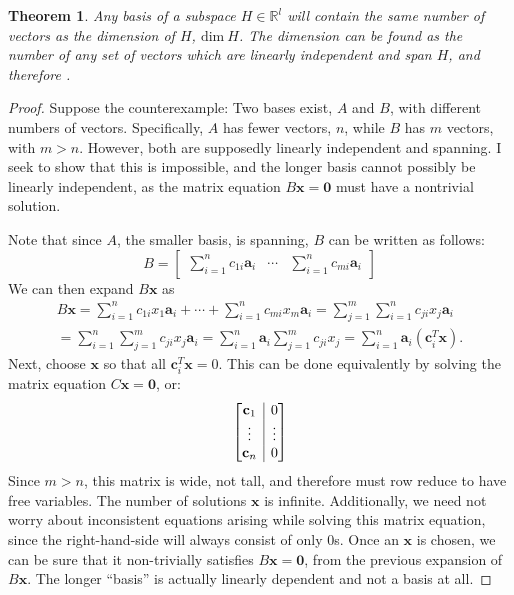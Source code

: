 \documentclass[draft,12pt]{report}
\makeatletter
\newtheorem{theorem}{Theorem}
\newenvironment{amatrix}[1]{%
  \left[\begin{array}{@{}*{#1}{c}|c@{}}
}{%
  \end{array}\right]
}
\renewcommand{\vec}[1]{\mathbf{#1}}
\makeatother
\begin{document}
\begin{theorem}
    Any basis of a subspace $H \in \mathbb R^l$ will contain the same number of vectors as the dimension of $H$, $\mathrm{dim\ } H$. The dimension can be found as the number of any set of vectors which are linearly independent and span $H$, and therefore .
\end{theorem}
\begin{proof}
    Suppose the counterexample: Two bases exist, $A$ and $B$, with different numbers of vectors. Specifically, $A$ has fewer vectors, $n$, while $B$ has $m$ vectors, with $m > n$. However, both are supposedly linearly independent and spanning. I seek to show that this is impossible, and the longer basis cannot possibly be linearly independent, as the matrix equation $B\vec{x} = \vec{0}$ must have a nontrivial solution.
    
    Note that since $A$, the smaller basis, is spanning, $B$ can be written as follows:
    \[ B = \begin{bmatrix} \sum_{i = 1}^n c_{1i} \vec{a}_i & \cdots & \sum_{i = 1}^n c_{mi} \vec{a}_i \end{bmatrix} \]
    We can then expand $B\vec{x}$ as
    \begin{multline*}
        B\vec{x} = \sum_{i = 1}^n c_{1i} x_1 \vec{a}_i + \cdots + \sum_{i = 1}^n c_{mi} x_m \vec{a}_i = \sum_{j = 1}^m \sum_{i = 1}^n c_{ji} x_j \vec{a}_i \\
        = \sum_{i = 1}^n \sum_{j = 1}^m c_{ji} x_j \vec{a}_i = \sum_{i = 1}^n \vec{a}_i \sum_{j = 1}^m c_{ji} x_j = \sum_{i = 1}^n \vec{a}_i (\vec{c}_i^T \vec{x}).
    \end{multline*}
    Next, choose $\vec{x}$ so that all $\vec{c}_i^T \vec{x} = 0$. This can be done equivalently by solving the matrix equation $C\vec{x} = \vec{0}$, or:
    \[ \begin{amatrix}{1}
        \vec{c}_1 & 0 \\
        \vdots & \vdots \\
        \vec{c}_n & 0
    \end{amatrix} \]
    Since $m > n$, this matrix is wide, not tall, and therefore must row reduce to have free variables. The number of solutions $\vec{x}$ is infinite. Additionally, we need not worry about inconsistent equations arising while solving this matrix equation, since the right-hand-side will always consist of only 0s. Once an $\vec{x}$ is chosen, we can be sure that it non-trivially satisfies $B\vec{x} = \vec{0}$, from the previous expansion of $B\vec{x}$. The longer ``basis'' is actually linearly dependent and not a basis at all.
\end{proof}
\end{document}
